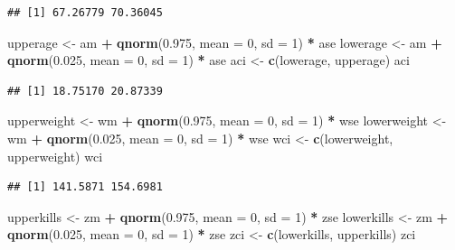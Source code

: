 \documentclass[]{article}
\newenvironment{Shaded}{\begin{snugshade}}{\end{snugshade}}
\newcommand{\KeywordTok}[1]{\textcolor[rgb]{0.13,0.29,0.53}{\textbf{#1}}}
\newcommand{\DataTypeTok}[1]{\textcolor[rgb]{0.13,0.29,0.53}{#1}}
\newcommand{\DecValTok}[1]{\textcolor[rgb]{0.00,0.00,0.81}{#1}}
\newcommand{\FloatTok}[1]{\textcolor[rgb]{0.00,0.00,0.81}{#1}}
\newcommand{\StringTok}[1]{\textcolor[rgb]{0.31,0.60,0.02}{#1}}
\newcommand{\OperatorTok}[1]{\textcolor[rgb]{0.81,0.36,0.00}{\textbf{#1}}}
\newcommand{\NormalTok}[1]{#1}
\begin{document}
\begin{verbatim}
## [1] 67.26779 70.36045
\end{verbatim}

\begin{Shaded}
\begin{Highlighting}[]
\NormalTok{upperage <-}\StringTok{ }\NormalTok{am }\OperatorTok{+}\StringTok{ }\KeywordTok{qnorm}\NormalTok{(}\FloatTok{0.975}\NormalTok{, }\DataTypeTok{mean =} \DecValTok{0}\NormalTok{, }\DataTypeTok{sd =} \DecValTok{1}\NormalTok{) }\OperatorTok{*}\StringTok{ }\NormalTok{ase}
\NormalTok{lowerage <-}\StringTok{ }\NormalTok{am }\OperatorTok{+}\StringTok{ }\KeywordTok{qnorm}\NormalTok{(}\FloatTok{0.025}\NormalTok{, }\DataTypeTok{mean =} \DecValTok{0}\NormalTok{, }\DataTypeTok{sd =} \DecValTok{1}\NormalTok{) }\OperatorTok{*}\StringTok{ }\NormalTok{ase }
\NormalTok{aci <-}\StringTok{ }\KeywordTok{c}\NormalTok{(lowerage, upperage)}
\NormalTok{aci}
\end{Highlighting}
\end{Shaded}

\begin{verbatim}
## [1] 18.75170 20.87339
\end{verbatim}

\begin{Shaded}
\begin{Highlighting}[]
\NormalTok{upperweight <-}\StringTok{ }\NormalTok{wm }\OperatorTok{+}\StringTok{ }\KeywordTok{qnorm}\NormalTok{(}\FloatTok{0.975}\NormalTok{, }\DataTypeTok{mean =} \DecValTok{0}\NormalTok{, }\DataTypeTok{sd =} \DecValTok{1}\NormalTok{) }\OperatorTok{*}\StringTok{ }\NormalTok{wse}
\NormalTok{lowerweight <-}\StringTok{ }\NormalTok{wm }\OperatorTok{+}\StringTok{ }\KeywordTok{qnorm}\NormalTok{(}\FloatTok{0.025}\NormalTok{, }\DataTypeTok{mean =} \DecValTok{0}\NormalTok{, }\DataTypeTok{sd =} \DecValTok{1}\NormalTok{) }\OperatorTok{*}\StringTok{ }\NormalTok{wse }
\NormalTok{wci <-}\StringTok{ }\KeywordTok{c}\NormalTok{(lowerweight, upperweight)}
\NormalTok{wci}
\end{Highlighting}
\end{Shaded}

\begin{verbatim}
## [1] 141.5871 154.6981
\end{verbatim}

\begin{Shaded}
\begin{Highlighting}[]
\NormalTok{upperkills <-}\StringTok{ }\NormalTok{zm }\OperatorTok{+}\StringTok{ }\KeywordTok{qnorm}\NormalTok{(}\FloatTok{0.975}\NormalTok{, }\DataTypeTok{mean =} \DecValTok{0}\NormalTok{, }\DataTypeTok{sd =} \DecValTok{1}\NormalTok{) }\OperatorTok{*}\StringTok{ }\NormalTok{zse}
\NormalTok{lowerkills <-}\StringTok{ }\NormalTok{zm }\OperatorTok{+}\StringTok{ }\KeywordTok{qnorm}\NormalTok{(}\FloatTok{0.025}\NormalTok{, }\DataTypeTok{mean =} \DecValTok{0}\NormalTok{, }\DataTypeTok{sd =} \DecValTok{1}\NormalTok{) }\OperatorTok{*}\StringTok{ }\NormalTok{zse }
\NormalTok{zci <-}\StringTok{ }\KeywordTok{c}\NormalTok{(lowerkills, upperkills)}
\NormalTok{zci}
\end{Highlighting}
\end{Shaded}
\end{document}
